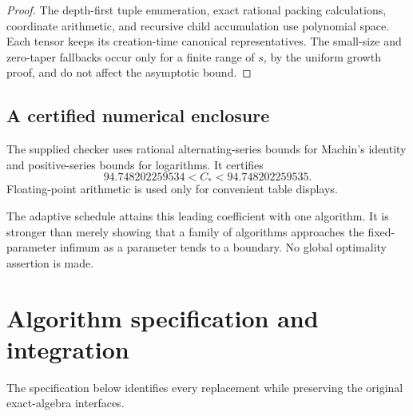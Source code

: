\documentclass[11pt,letterpaper]{article}
\numberwithin{equation}{section}
\theoremstyle{definition}\newtheorem{definition}[theorem]{Definition}
\theoremstyle{remark}\newtheorem{remark}[theorem]{Remark}
\newcommand{\Cstar}{C_*}
\begin{document}
\begin{proof}
The depth-first tuple enumeration, exact rational packing calculations,
coordinate arithmetic, and recursive child accumulation use polynomial
space. Each tensor keeps its creation-time canonical representatives.
The small-size and zero-taper fallbacks occur only for a finite range of
$s$, by the uniform growth proof, and do not affect the asymptotic bound.
\end{proof}

\subsection{A certified numerical enclosure}

The supplied checker uses rational alternating-series bounds for Machin's
identity and positive-series bounds for logarithms. It certifies
\[
 94.748202259534<\Cstar<94.748202259535.
\]
Floating-point arithmetic is used only for convenient table displays.

The adaptive schedule attains this leading coefficient with one algorithm.
It is stronger than merely showing that a family of algorithms approaches
the fixed-parameter infimum as a parameter tends to a boundary.
No global optimality assertion is made.

\section{Algorithm specification and integration}
\label{sec:algorithm}

The specification below identifies every replacement while preserving
the original exact-algebra interfaces.
\end{document}

